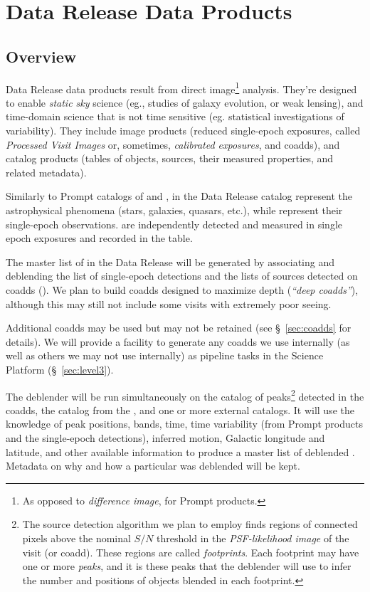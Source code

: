 \clearpage

\section{Data Release Data Products}
\label{sec:level2}

\subsection{Overview}

Data Release data products result from direct image\footnote{As opposed to \emph{difference image}, for Prompt products.} analysis. They're designed to enable \emph{static sky} science (eg., studies of galaxy evolution, or weak lensing), and time-domain science that is not time sensitive (eg. statistical investigations of variability). They include image products (reduced single-epoch exposures, called \emph{Processed Visit Images} or, sometimes, \emph{calibrated exposures}, and coadds), and catalog products (tables of objects, sources, their measured properties, and related metadata).

Similarly to Prompt catalogs of \DIAObjects and \DIASources, \Objects in the Data Release catalog represent the astrophysical phenomena (stars, galaxies, quasars, etc.), while \Sources represent their single-epoch observations. \Sources are independently detected and measured in single epoch exposures and recorded in the \Source table.

The master list of \Objects in the Data Release will be generated by associating and deblending the list of single-epoch \DIASource detections and the lists of sources detected on coadds (\CoaddSources). We plan to build coadds designed to maximize depth (\emph{``deep coadds''}), although this may still not include some visits with extremely poor seeing.

Additional coadds may be used but may not be retained (see \S~\ref{sec:coadds} for details). We will provide a facility to generate any coadds we use internally (as well as others we may not use internally) as pipeline tasks in the Science Platform (\S~\ref{sec:level3}).

The deblender will be run simultaneously on the catalog of peaks\footnote{The source detection algorithm we plan to employ finds regions of connected pixels above the nominal $S/N$ threshold in the \emph{PSF-likelihood image} of the visit (or coadd). These regions are called \emph{footprints}. Each footprint may have one or more \emph{peaks}, and it is these peaks that the deblender will use to infer the number and positions of objects blended in each footprint.} detected in the coadds, the \DIAObject catalog from the \PPDB, and one or more external catalogs.  It will use the knowledge of peak positions, bands, time, time variability (from Prompt products and the single-epoch \Source detections), inferred motion, Galactic longitude and latitude, and other available information to produce a master list of deblended \Objects. Metadata on why and how a particular \Object was deblended will be kept.

